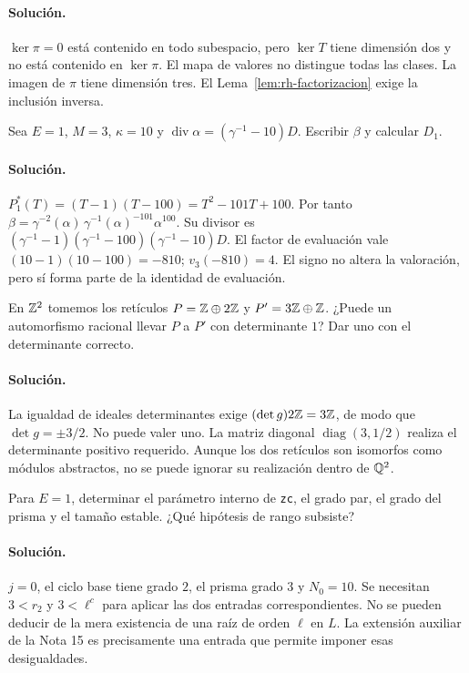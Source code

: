 \paragraph{Solución.} $\ker\pi=0$ está contenido en todo subespacio, pero $\ker T$ tiene dimensión dos y no está contenido en $\ker\pi$. El mapa de valores no distingue todas las clases. La imagen de $\pi$ tiene dimensión tres. El Lema~\ref{lem:rh-factorizacion} exige la inclusión inversa.

\begin{ejercicio}
Sea $E=1$, $M=3$, $\kappa=10$ y $\operatorname{div}\alpha=(\gamma^{-1}-10)D$. Escribir $\beta$ y calcular $D_1$.
\end{ejercicio}
\paragraph{Solución.} $P_1^*(T)=(T-1)(T-100)=T^2-101T+100$. Por tanto $\beta=\gamma^{-2}(\alpha)\,\gamma^{-1}(\alpha)^{-101}\alpha^{100}$. Su divisor es $(\gamma^{-1}-1)(\gamma^{-1}-100)(\gamma^{-1}-10)D$. El factor de evaluación vale $(10-1)(10-100)=-810$; $v_3(-810)=4$. El signo no altera la valoración, pero sí forma parte de la identidad de evaluación.

\begin{ejercicio}
En $\mathbb{Z}^2$ tomemos los retículos $P=\mathbb{Z}\oplus 2\mathbb{Z}$ y $P'=3\mathbb{Z}\oplus\mathbb{Z}$. ¿Puede un automorfismo racional llevar $P$ a $P'$ con determinante $1$? Dar uno con el determinante correcto.
\end{ejercicio}
\paragraph{Solución.} La igualdad de ideales determinantes exige $(\det g)2\mathbb{Z}=3\mathbb{Z}$, de modo que $\det g=\pm3/2$. No puede valer uno. La matriz diagonal $\operatorname{diag}(3,1/2)$ realiza el determinante positivo requerido. Aunque los dos retículos son isomorfos como módulos abstractos, no se puede ignorar su realización dentro de $\mathbb{Q}^2$.

\begin{ejercicio}
Para $E=1$, determinar el parámetro interno de \texttt{zc}, el grado par, el grado del prisma y el tamaño estable. ¿Qué hipótesis de rango subsiste?
\end{ejercicio}
\paragraph{Solución.} $j=0$, el ciclo base tiene grado $2$, el prisma grado $3$ y $N_0=10$. Se necesitan $3<r_2$ y $3<\ell^c$ para aplicar las dos entradas correspondientes. No se pueden deducir de la mera existencia de una raíz de orden $\ell$ en $L$. La extensión auxiliar de la Nota 15 es precisamente una entrada que permite imponer esas desigualdades.

